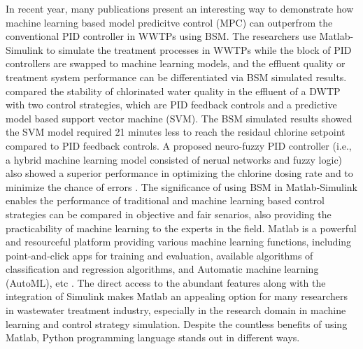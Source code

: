 In recent year, many publications present an interesting way to demonstrate how machine learning based model predicitve control (MPC) can outperfrom the conventional PID controller in WWTPs using BSM. The researchers use Matlab-Simulink to simulate the treatment processes in WWTPs while the block of PID controllers are swapped to machine learning models, and the effluent quality or treatment system performance can be differentiated via BSM simulated results. \citet{wangModelPredictiveControl2020} compared the stability of chlorinated water quality in the effluent of a DWTP with two control strategies, which are PID feedback controls and a predictive model based support vector machine (SVM). The BSM simulated results showed the SVM model required 21 minutes less to reach the residaul chlorine setpoint compared to PID feedback controls. A proposed neuro-fuzzy PID controller (i.e., a hybrid machine learning model consisted of nerual networks and fuzzy logic) also showed a superior performance in optimizing the chlorine dosing rate and to minimize the chance of errors \citep{hongApplicationNeurofuzzyPID2012}. The significance of using BSM in Matlab-Simulink enables the performance of traditional and machine learning based control strategies can be compared in objective and fair senarios, also providing the practicability of machine learning to the experts in the field. Matlab is a powerful and resourceful platform providing various machine learning functions, including point-and-click apps for training and evaluation, available algorithms of classification and regression algorithms, and Automatic machine learning (AutoML), etc \citep{mathworksMATLABMachineLearning2022}. The direct access to the abundant features along with the integration of Simulink makes Matlab an appealing option for many researchers in wastewater treatment industry, especially in the research domain in machine learning and control strategy simulation. Despite the countless benefits of using Matlab, Python programming language stands out in different ways.

